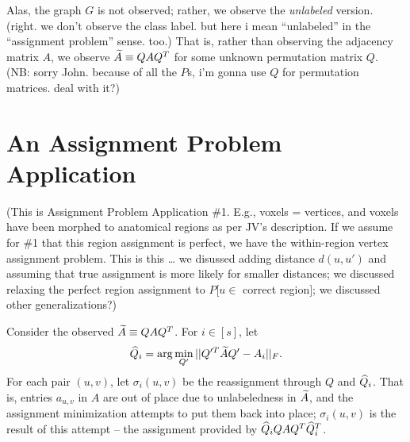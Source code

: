 Alas, the graph $G$ is not observed;
rather, we observe the {\em unlabeled} version.
(right. we don't observe the class label.
but here i mean ``unlabeled'' in the ``assignment problem'' sense.
too.)
That is, rather than observing the adjacency matrix $A$,
we observe $\widetilde{A} \equiv QAQ^T$ for some unknown permutation matrix $Q$.
\\
(NB: sorry John.  because of all the $P$s, i'm gonna use $Q$ for permutation matrices.  deal with it?)




\section{An Assignment Problem Application}


(This is Assignment Problem Application \#1.
E.g., voxels = vertices,
and voxels have been morphed to anatomical regions as per JV's description.
If we assume for \#1 that this region assignment is perfect,
we have the within-region vertex assignment problem.
This is this \dots
we disussed adding distance $d(u,u')$ and assuming that true assignment is more likely for smaller distances;
we discussed relaxing the perfect region assignment to $P[u \in$ correct region$]$;
we discussed other generalizations?)



%
%

Consider the observed $\widetilde{A} \equiv QAQ^T$.
For $i \in [s]$, let
\begin{eqnarray}\label{assignmenteqn}
\widehat{Q}_i = \arg\min_{Q'} ||Q'^T \widetilde{A} Q' - A_i||_F.
\end{eqnarray}
For each pair $(u,v)$, let $\sigma_i(u,v)$ be the reassignment through $Q$ and $\widehat{Q}_i$.
That is, entries $a_{u,v}$ in $A$ are out of place due to unlabeledness in $\widetilde{A}$,
and the assignment minimization attempts to put them back into place;
$\sigma_i(u,v)$ is the result of this attempt -- the assignment provided by
$\widehat{Q}_i Q A Q^T \widehat{Q}_i^T$.





